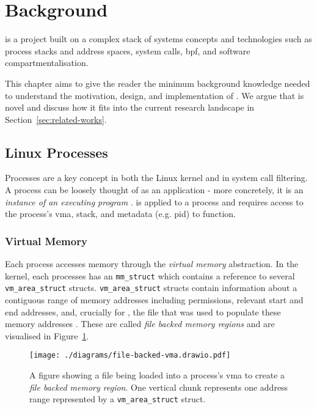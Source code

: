 \section{Background}\label{sec:background}

\af is a project built on a complex stack of systems concepts and technologies
such as process stacks and address spaces, system calls, \ac{bpf}, and software
compartmentalisation. 

This chapter aims to give the reader the minimum background knowledge needed
to understand the motivation, design, and implementation of \af. We argue that
\af is novel and discuss how it  fits into the current research landscape in
Section~\ref{sec:related-works}.

\subsection{Linux Processes}

Processes are a key concept in both the Linux kernel and in system call
filtering. A process can be loosely thought of as an application - more 
concretely, it is an \textit{instance of an executing program} 
\cite{LINUX_PROGRAMMING_INTERFACE}. \af is applied to a process and requires 
access to the process's \ac{vma}, stack, and metadata (e.g. \ac{pid}) to 
function.

\subsubsection{Virtual Memory}

Each process accesses memory through the \textit{virtual memory} abstraction.
In the kernel, each processes has an \texttt{mm\_struct} which contains a
reference to several \texttt{vm\_area\_struct} structs. 
\texttt{vm\_area\_struct} structs contain information about a contiguous
range of memory addresses including permissions, relevant start and end
addresses, and, crucially for \af, the file that was used to populate these
memory addresses \cite{love2005linux}. These are called \textit{file backed
memory regions} and are visualised in Figure~\ref{fig:file-backed-vma}.

\begin{figure}[ht]
    \centering
    \texttt{[image: ./diagrams/file-backed-vma.drawio.pdf]} 
    \caption{A figure showing a file being loaded into a process's \ac{vma} to
    create a \textit{file backed memory region}. One vertical chunk represents
one address range represented by a \texttt{vm\_area\_struct} struct.}
    \label{fig:file-backed-vma}
\end{figure}


